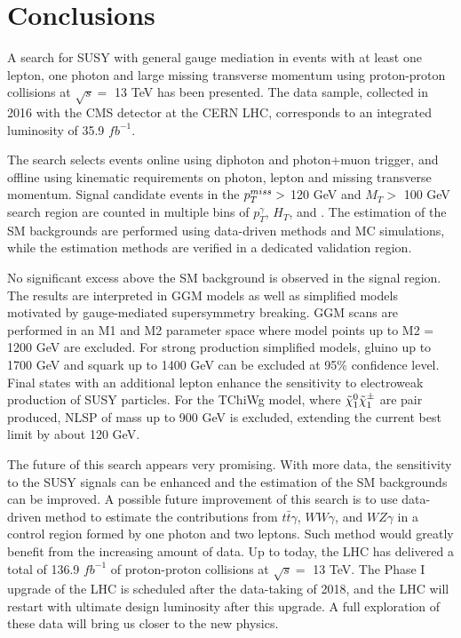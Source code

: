 \documentclass[thesis.tex]{subfiles}
\renewcommand\_{\textunderscore\allowbreak}
\begin{document}
\chapter{Conclusions}
\label{ch8}

A search for SUSY with general gauge mediation in events with at least one lepton, one photon and large missing transverse momentum using proton-proton collisions at $\sqrt{s} = $ 13 TeV has been presented. 
The data sample, collected in 2016 with the CMS detector at the CERN LHC, corresponds to an integrated luminosity of 35.9 $fb^{-1}$. 

The search selects events online using diphoton and photon+muon trigger, and offline using kinematic requirements on photon, lepton and missing transverse momentum.  
Signal candidate events in the $p_T^{miss} > $ 120 GeV and $M_T >$ 100 GeV search region are counted in multiple bins of $p_T^\gamma$, $H_T$, and \MET. 
The estimation of the SM backgrounds are performed using data-driven methods and MC simulations, while the estimation methods are verified in a dedicated validation region. 

No significant excess above the SM background is observed in the signal region.
The results are interpreted in GGM models as well as simplified models motivated by gauge-mediated supersymmetry breaking. 
GGM scans are performed in an M1 and M2 parameter space where model points up to M2 = 1200 GeV are excluded.
For strong production simplified models, gluino up to 1700 GeV and squark up to 1400 GeV can be excluded at 95\% confidence level. 
Final states with an additional lepton enhance the sensitivity to electroweak production of SUSY particles. 
For the TChiWg model, where $\tilde{\chi}_1^0\tilde{\chi}_1^\pm$ are pair produced, NLSP of mass up to 900 GeV is excluded, extending the current best limit by about 120 GeV. 

The future of this search appears very promising. 
With more data, the sensitivity to the SUSY signals can be enhanced and the estimation of the SM backgrounds can be improved.  
A possible future improvement of this search is to use data-driven method to estimate the contributions from $t\bar{t}\gamma$, $WW\gamma$, and $WZ\gamma$ in a control region formed by one photon and two leptons. 
Such method would greatly benefit from the increasing amount of data. 
Up to today, the LHC has delivered a total of 136.9 $fb^{-1}$ of proton-proton collisions at $\sqrt{s} = $ 13 TeV. 
The Phase I upgrade of the LHC is scheduled after the data-taking of 2018, and the LHC will restart with ultimate design luminosity after this upgrade.  
A full exploration of these data will bring us closer to the new physics.
\end{document}
